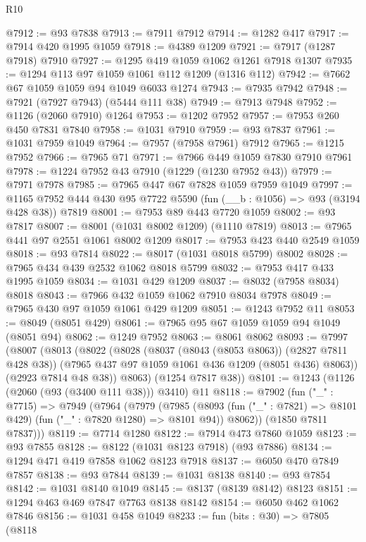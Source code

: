 \begin{lexlean}{R10}
\begin{coremodule}
@7912 := @93 @7838
@7913 := @7911 @7912
@7914 := @1282 @417
@7917 := @7914 @420 @1995 @1059
@7918 := @4389 @1209
@7921 := @7917 (@1287 @7918) @7910
@7927 := @1295 @419 @1059 @1062 @1261 @7918 @1307
@7935 := @1294 @113 @97 @1059 @1061 @112 @1209 (@1316 @112)
@7942 := @7662 @67 @1059 @1059 @94 @1049 @6033 @1274
@7943 := @7935 @7942
@7948 := @7921 (@7927 @7943) (@5444 @111 @38)
@7949 := @7913 @7948
@7952 := @1126 (@2060 @7910) @1264
@7953 := @1202 @7952
@7957 := @7953 @260 @450 @7831 @7840
@7958 := @1031 @7910
@7959 := @93 @7837
@7961 := @1031 @7959 @1049
@7964 := @7957 (@7958 @7961) @7912
@7965 := @1215 @7952
@7966 := @7965 @71
@7971 := @7966 @449 @1059 @7830 @7910 @7961
@7978 := @1224 @7952 @43 @7910 (@1229 (@1230 @7952 @43))
@7979 := @7971 @7978
@7985 := @7965 @447 @67 @7828 @1059 @7959 @1049
@7997 := @1165 @7952 @444 @430 @95 @7722 @5590 (fun (__b : @1056) => @93 (@3194 @428 @38)) @7819
@8001 := @7953 @89 @443 @7720 @1059
@8002 := @93 @7817
@8007 := @8001 (@1031 @8002 @1209) (@1110 @7819)
@8013 := @7965 @441 @97 @2551 @1061 @8002 @1209
@8017 := @7953 @423 @440 @2549 @1059
@8018 := @93 @7814
@8022 := @8017 (@1031 @8018 @5799) @8002
@8028 := @7965 @434 @439 @2532 @1062 @8018 @5799
@8032 := @7953 @417 @433 @1995 @1059
@8034 := @1031 @429 @1209
@8037 := @8032 (@7958 @8034) @8018
@8043 := @7966 @432 @1059 @1062 @7910 @8034 @7978
@8049 := @7965 @430 @97 @1059 @1061 @429 @1209
@8051 := @1243 @7952 @11
@8053 := @8049 (@8051 @429)
@8061 := @7965 @95 @67 @1059 @1059 @94 @1049 (@8051 @94)
@8062 := @1249 @7952
@8063 := @8061 @8062
@8093 := @7997
    (@8007
      (@8013
        (@8022
          (@8028
            (@8037 (@8043 (@8053 @8063)) (@2827 @7811 @428 @38))
            (@7965 @437 @97 @1059 @1061 @436 @1209 (@8051 @436) @8063))
          (@2923 @7814 @48 @38))
        @8063)
      (@1254 @7817 @38))
@8101 := @1243 (@1126 (@2060 (@93 (@3400 @111 @38))) @3410) @11
@8118 := @7902
    (fun ("_" : @7715) =>
    @7949
      (@7964
        (@7979
          (@7985
            (@8093 (fun ("_" : @7821) => @8101 @429) (fun ("_" : @7820 @1280) => @8101 @94))
            @8062))
        (@1850 @7811 @7837)))
@8119 := @7714 @1280
@8122 := @7914 @473 @7860 @1059
@8123 := @93 @7855
@8128 := @8122 (@1031 @8123 @7918) (@93 @7886)
@8134 := @1294 @471 @419 @7858 @1062 @8123 @7918
@8137 := @6050 @470 @7849 @7857
@8138 := @93 @7844
@8139 := @1031 @8138
@8140 := @93 @7854
@8142 := @1031 @8140 @1049
@8145 := @8137 (@8139 @8142) @8123
@8151 := @1294 @463 @469 @7847 @7763 @8138 @8142
@8154 := @6050 @462 @1062 @7846
@8156 := @1031 @458 @1049
@8233 := fun (bits : @30) =>
  @7805
    (@8118

\end{coremodule}
\end{lexlean}
